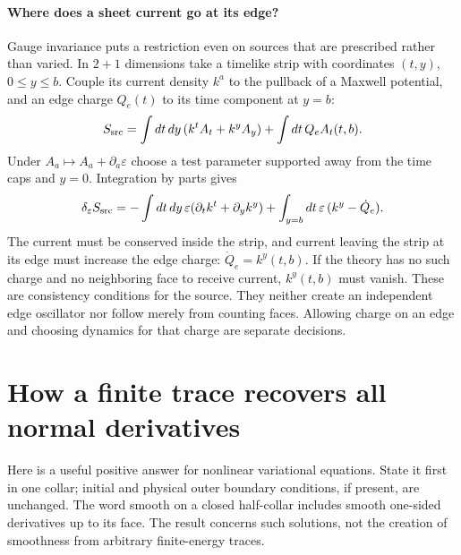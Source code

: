 \paragraph{Where does a sheet current go at its edge?} Gauge invariance puts a restriction even on sources that are prescribed rather than varied. In $2+1$ dimensions take a timelike strip with coordinates $(t,y)$, $0\leq y\leq b$. Couple its current density $k^a$ to the pullback of a Maxwell potential, and an edge charge $Q_e(t)$ to its time component at $y=b$:
\[
 S_{\rm src}=\int dt\,dy\,(k^t A_t+k^y A_y)+\int dt\, Q_e A_t(t,b).
\]
Under $A_a\mapsto A_a+\partial_a\varepsilon$ choose a test parameter supported away from the time caps and $y=0$. Integration by parts gives
\[
 \delta_\varepsilon S_{\rm src}=-\int dt\,dy\,\varepsilon(\partial_t k^t+\partial_y k^y)
  +\int_{y=b} dt\,\varepsilon\,(k^y-\dot Q_e).
\]
The current must be conserved inside the strip, and current leaving the strip at its edge must increase the edge charge: $\dot Q_e=k^y(t,b)$. If the theory has no such charge and no neighboring face to receive current, $k^y(t,b)$ must vanish. These are consistency conditions for the source. They neither create an independent edge oscillator nor follow merely from counting faces. Allowing charge on an edge and choosing dynamics for that charge are separate decisions.

\section{How a finite trace recovers all normal derivatives}
Here is a useful positive answer for nonlinear variational equations. State it first in one collar; initial and physical outer boundary conditions, if present, are unchanged. The word smooth on a closed half-collar includes smooth one-sided derivatives up to its face. The result concerns such solutions, not the creation of smoothness from arbitrary finite-energy traces.

